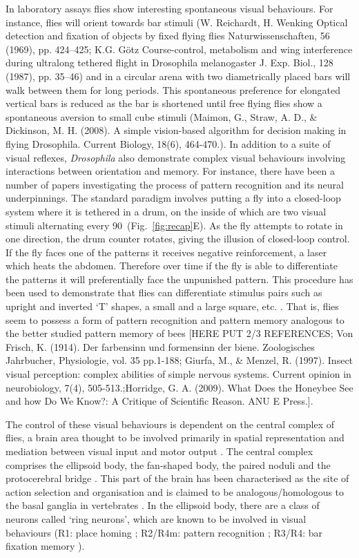 In laboratory assays flies show interesting spontaneous visual behaviours. For instance, flies will orient towards bar stimuli (W. Reichardt, H. Wenking
Optical detection and fixation of objects by fixed flying flies
Naturwissenschaften, 56 (1969), pp. 424--425; K.G. G\"{o}tz
Course-control, metabolism and wing interference during ultralong tethered flight in Drosophila melanogaster
J. Exp. Biol., 128 (1987), pp. 35--46) and in a circular arena with two diametrically placed bars will walk between them for long periods. This spontaneous preference for elongated vertical bars is reduced as the bar is shortened until free flying flies show a spontaneous aversion to small cube stimuli (Maimon, G., Straw, A. D., \& Dickinson, M. H. (2008). A simple vision-based algorithm for decision making in flying Drosophila. Current Biology, 18(6), 464-470.). In addition to a suite of visual reflexes, \emph{Drosophila} also demonstrate complex visual behaviours involving interactions between orientation and memory.
For instance, there have been a number of papers investigating the process of pattern recognition and its neural underpinnings\cite{Pan2009,Liu2006,Ernst1999}.
The standard paradigm involves putting a fly into a closed-loop system where it is tethered in a drum, on the inside of which are two visual stimuli alternating every 90\degree\ (Fig.~\ref{fig:recap}E). As the fly attempts to rotate in one direction, the drum counter rotates, giving the illusion of closed-loop control. If the fly faces one of the patterns it receives negative reinforcement, a laser which heats the abdomen. Therefore over time if the fly is able to differentiate the patterns it will preferentially face the unpunished pattern. This procedure has been used to demonstrate that flies can differentiate stimulus pairs such as upright and inverted `T' shapes, a small and a large square, etc. \cite{Ernst1999}. That is, flies seem to possess a form of pattern recognition and pattern memory analogous to the better studied pattern memory of bees [HERE PUT 2/3 REFERENCES; Von Frisch, K. (1914). Der farbensinn und formensinn der biene. Zoologisches Jahrbucher, Physiologie, vol. 35 pp.1-188; Giurfa, M., \& Menzel, R. (1997). Insect visual perception: complex abilities of simple nervous systems. Current opinion in neurobiology, 7(4), 505-513.;Horridge, G. A. (2009). What Does the Honeybee See and how Do We Know?: A Critique of Scientific Reason. ANU E Press.].

The control of these visual behaviours is dependent on the central complex of flies, a brain area thought to be involved primarily in spatial representation and mediation between visual input and motor output \cite{Pfeiffer2014}.
The central complex comprises the ellipsoid body, the fan-shaped body, the paired noduli and the protocerebral bridge \cite{Young2010}.
This part of the brain has been characterised as the site of action selection and organisation and is claimed to be analogous/homologous to the basal ganglia in vertebrates \cite{Strausfeld2013}.
In the ellipsoid body, there are a class of neurons called `ring neurons', which are known to be involved in visual behaviours (R1: place homing \cite{Ofstad2011,Sitaraman2010,Sitaraman2008}; R2/R4m: pattern recognition \cite{Pan2009,Liu2006,Ernst1999}; R3/R4: bar fixation memory \cite{Neuser2008}).

